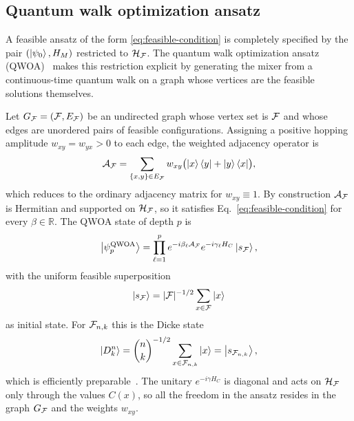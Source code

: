 \subsection{\label{subsec:qwoa-general}Quantum walk optimization ansatz}

A feasible ansatz of the form \eqref{eq:feasible-condition} is completely
specified by the pair $(\ket{\psi_0},H_M)$ restricted to $\mathcal{H}_{\mathcal{F}}$.
The quantum walk optimization ansatz (QWOA)~\cite{Marsh2019,Marsh2020} makes
this restriction explicit by generating the mixer from a continuous-time
quantum walk on a graph whose vertices are the feasible solutions themselves.

Let $G_{\mathcal{F}}=(\mathcal{F},E_{\mathcal{F}})$ be an undirected graph whose vertex set is $\mathcal{F}$ and
whose edges are unordered pairs of feasible configurations. Assigning a
positive hopping amplitude $w_{xy}=w_{yx}>0$ to each edge, the weighted
adjacency operator is
\begin{equation}
    \mathcal{A}_{\mathcal{F}}
    =
    \sum_{\{x,y\}\in E_{\mathcal{F}}}
    w_{xy}\bigl(\ket{x}\bra{y}+\ket{y}\bra{x}\bigr),
    \label{eq:feasible-adjacency}
\end{equation}
which reduces to the ordinary adjacency matrix for $w_{xy}\equiv1$. By
construction $\mathcal{A}_{\mathcal{F}}$ is Hermitian and supported on
$\mathcal{H}_{\mathcal{F}}$, so it satisfies Eq.~\eqref{eq:feasible-condition} for
every $\beta\in\mathbb{R}$. The QWOA state of depth $p$ is
\begin{equation}
    \bigl|\psi_p^{\mathrm{QWOA}}\bigr\rangle
    =
    \prod_{\ell=1}^{p}
    e^{-i\beta_\ell \mathcal{A}_{\mathcal{F}}}
    e^{-i\gamma_\ell H_C}
    \ket{s_{\mathcal{F}}},
    \label{eq:qwoa-state}
\end{equation}
with the uniform feasible superposition
\begin{equation}
    \ket{s_{\mathcal{F}}}
    =
    |\mathcal{F}|^{-1/2}
    \sum_{x\in\mathcal{F}}\ket{x}
    \label{eq:uniform-feasible-state}
\end{equation}
as initial state. For $\mathcal{F}_{n,k}$ this is the Dicke state
\begin{equation}
    \ket{D^{n}_{k}}
    =
    \binom{n}{k}^{-1/2}
    \sum_{x\in\mathcal{F}_{n,k}}\ket{x}
    =
    \ket{s_{\mathcal{F}_{n,k}}} ,
    \label{eq:dicke-state}
\end{equation}
which is efficiently preparable~\cite{Bartschi2019}. The unitary
$e^{-i\gamma H_C}$ is diagonal and acts on $\mathcal{H}_{\mathcal{F}}$ only through the
values $C(x)$, so all the freedom in the ansatz resides in the graph
$G_{\mathcal{F}}$ and the weights $w_{xy}$.

